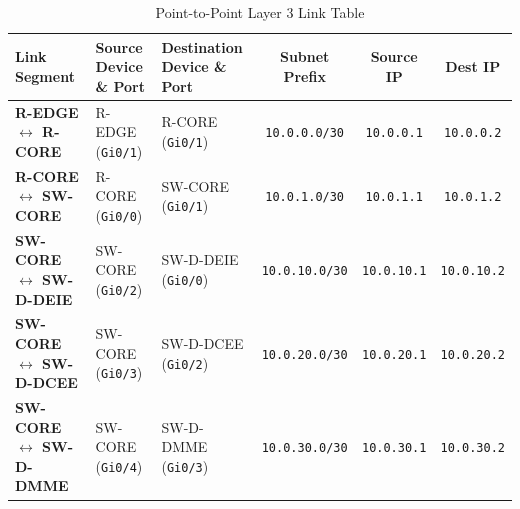 \documentclass[11pt,a4paper]{article}
\begin{document}
\begin{table}[htbp]
\centering
\caption{Point-to-Point Layer 3 Link Table}
\label{tab:p2p}
\small
\begin{tabularx}{\textwidth}{@{}L L L C C C@{}}
\toprule
\textbf{Link Segment} & \textbf{Source Device \& Port} & \textbf{Destination Device \& Port} & \textbf{Subnet Prefix} & \textbf{Source IP} & \textbf{Dest IP} \\
\midrule
\textbf{R-EDGE $\leftrightarrow$ R-CORE} & R-EDGE (\texttt{Gi0/1}) & R-CORE (\texttt{Gi0/1}) & \texttt{10.0.0.0/30} & \texttt{10.0.0.1} & \texttt{10.0.0.2} \\
\textbf{R-CORE $\leftrightarrow$ SW-CORE} & R-CORE (\texttt{Gi0/0}) & SW-CORE (\texttt{Gi0/1}) & \texttt{10.0.1.0/30} & \texttt{10.0.1.1} & \texttt{10.0.1.2} \\
\textbf{SW-CORE $\leftrightarrow$ SW-D-DEIE} & SW-CORE (\texttt{Gi0/2}) & SW-D-DEIE (\texttt{Gi0/0}) & \texttt{10.0.10.0/30} & \texttt{10.0.10.1} & \texttt{10.0.10.2} \\
\textbf{SW-CORE $\leftrightarrow$ SW-D-DCEE} & SW-CORE (\texttt{Gi0/3}) & SW-D-DCEE (\texttt{Gi0/2}) & \texttt{10.0.20.0/30} & \texttt{10.0.20.1} & \texttt{10.0.20.2} \\
\textbf{SW-CORE $\leftrightarrow$ SW-D-DMME} & SW-CORE (\texttt{Gi0/4}) & SW-D-DMME (\texttt{Gi0/3}) & \texttt{10.0.30.0/30} & \texttt{10.0.30.1} & \texttt{10.0.30.2} \\
\bottomrule
\end{tabularx}
\end{table}
\end{document}
